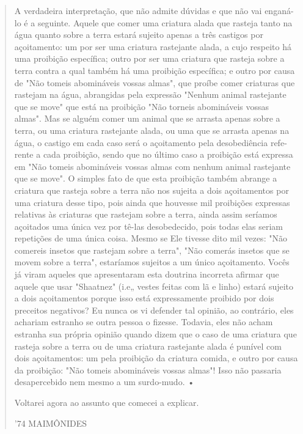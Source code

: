 \begin{quote}
A verdadeira interpretação, que não admite dúvidas e que não vai
enganá-lo é a seguinte. Aquele que comer uma criatura alada que rasteja
tanto na água quanto sobre a terra estará sujeito apenas a três castigos
por açoitamento: um por ser uma criatura rastejante alada, a cujo
respeito há uma proibição especí­fica; outro por ser uma criatura que
rasteja sobre a terra contra a qual também há uma proibição específica;
e outro por causa de "Não tomeis abomináveis vos­sas almas", que proíbe
comer criaturas que rastejam na água, abrangidas pela ex­pressão "Nenhum
animal rastejante que se move" que está na proibição "Não tor­neis
abomináveis vossas almas". Mas se alguém comer um animal que se arrasta
apenas sobre a terra, ou uma criatura rastejante alada, ou uma que se
arrasta ape­nas na água, o castigo em cada caso será o açoitamento pela
desobediência refe­rente a cada proibição, sendo que no último caso a
proibição está expressa em "Não tomeis abomináveis vossas almas com
nenhum animal rastejante que se mo­ve". O simples fato de que esta
proibição também abrange a criatura que rasteja sobre a terra não nos
sujeita a dois açoitamentos por uma criatura desse tipo, pois ainda que
houvesse mil proibições expressas relativas às criaturas que rastejam
sobre a terra, ainda assim seríamos açoitados uma única vez por tê-las
desobede­cido, pois todas elas seriam repetições de uma única coisa.
Mesmo se Ele tivesse dito mil vezes: "Não comereis insetos que rastejam
sobre a terra", "Não comerás insetos que se movem sobre a terra",
estaríamos sujeitos a um único açoitamento. Vocês já viram aqueles que
apresentaram esta doutrina incorreta afirmar que aquele que usar
"Shaatnez" (i.e„ vestes feitas com lã e linho) estará sujeito a dois
açoita­mentos porque isso está expressamente proibido por dois preceitos
negativos? Eu nunca os vi defender tal opinião, ao contrário, eles
achariam estranho se outra pessoa o fizesse. Todavia, eles não acham
estranha sua própria opinião quando dizem que o caso de uma criatura que
rasteja sobre a terra ou de uma criatura rastejante alada é punível com
dois açoitamentos: um pela proibição da criatura comida, e outro por
causa da proibição: "Não tomeis abomináveis vossas almas"! Isso não
passaria desapercebido nem mesmo a um surdo-mudo. •

Voltarei agora ao assunto que comecei a explicar.

'74 MAIMÔNIDES


\end{quote}

